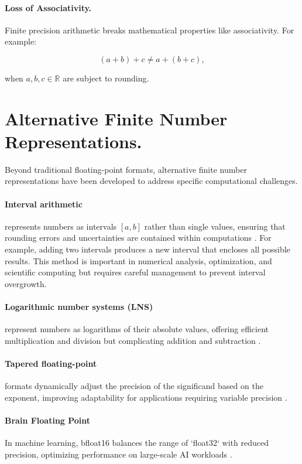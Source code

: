 \paragraph{Loss of Associativity.}
Finite precision arithmetic breaks mathematical properties like associativity. For example:

\[
(a + b) + c \neq a + (b + c),
\]

when \( a, b, c \in \mathbb{R} \) are subject to rounding.



\section{Alternative Finite Number Representations.}
Beyond traditional floating-point formats, alternative finite number representations have been developed to address specific computational challenges. 

\paragraph{Interval arithmetic} represents numbers as intervals \( [a, b] \) rather than single values, ensuring that rounding errors and uncertainties are contained within computations \cite{moore2009introduction}. For example, adding two intervals produces a new interval that encloses all possible results. This method is important in numerical analysis, optimization, and scientific computing but requires careful management to prevent interval overgrowth. 

\paragraph{Logarithmic number systems (LNS)} represent numbers as logarithms of their absolute values, offering efficient multiplication and division but complicating addition and subtraction \cite{naylor2013applications}. 

\paragraph{Tapered floating-point} formats dynamically adjust the precision of the significand based on the exponent, improving adaptability for applications requiring variable precision \cite{gustafson2015tapered}. 

\paragraph{Brain Floating Point} In machine learning, bfloat16 balances the range of `float32` with reduced precision, optimizing performance on large-scale AI workloads \cite{wang2019bfloat16}. 






